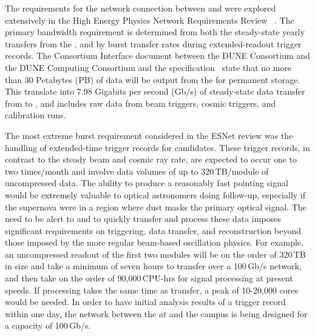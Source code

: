 \documentclass[../main-v1.tex]{subfiles}
\begin{document}
The requirements for the network connection between  and  were explored extensively in the High Energy Physics Network Requirements Review~\cite{bib:osti_1804717} . The primary bandwidth requirement is determined from both the steady-state yearly transfers from the , and by burst 
transfer rates during extended-readout trigger records. The Consortium Interface document between the DUNE  Consortium and the DUNE Computing Consortium and the  specification~\cite{edms:dunedaq} state that no more than 30 Petabytes (PB) of data will be output from the  for permanent storage. This translate into 7.98 Gigabits per second (Gb/s) of steady-state data transfer from  to , and includes raw data from beam triggers, cosmic triggers, and calibration runs. 

The most extreme burst requirement considered in the ESNet review was the handling of extended-time trigger records for %
 candidates. These trigger records, in contrast to the steady beam and cosmic ray rate,
are expected to occur one to two times/month and involve data volumes of up to 320\,TB/module of uncompressed  data. The ability to produce a reasonably fast pointing signal would be extremely valuable to optical astronomers doing follow-up, especially if the supernova were in a region where dust masks the primary optical signal. The need to be alert to %
 and to quickly transfer and process these data imposes significant requirements on triggering, data transfer, and reconstruction beyond those imposed by the more regular beam-based oscillation physics. For example, an uncompressed  readout of the first two  modules will be on the order of 320\,TB in size and take a minimum of seven hours to transfer over a 100\,Gb/s network, and then take on the order of 90,000\,CPU-hrs for signal processing at present speeds. If processing takes the same time as transfer, a peak of 10-20,000 cores would be needed. In order to have initial analysis results of a  trigger record within one day, the network between the   at  and the  campus is being designed for a capacity of 100\,Gb/s.  

\end{document}
